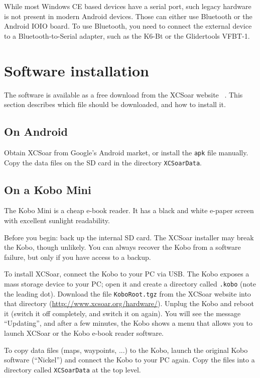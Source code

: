 While most Windows CE based devices have a serial port, such legacy
hardware is not present in modern Android devices.  Those can either
use Bluetooth or the Android IOIO board.  To use Bluetooth, you need
to connect the external device to a Bluetooth-to-Serial adapter, such
as the K6-Bt or the Glidertools VFBT-1.


\section{Software installation}

The software is available as a free download from the XCSoar website
~\xcsoarwebsite{}.  This section describes which file should be
downloaded, and how to install it.

\subsection*{On Android}

Obtain XCSoar from Google's Android market, or install the \verb|apk|
file manually.  Copy the data files on the SD card in the directory
\verb|XCSoarData|.

\subsection*{On a Kobo Mini}

The Kobo Mini is a cheap e-book reader.  It has a black and white
e-paper screen with excellent sunlight readability.

Before you begin: back up the internal SD card.  The XCSoar installer
may break the Kobo, though unlikely.  You can always recover the Kobo
from a software failure, but only if you have access to a backup.

To install XCSoar, connect the Kobo to your PC via USB.  The Kobo
exposes a mass storage device to your PC; open it and create a
directory called \texttt{.kobo} (note the leading dot).  Download the
file \texttt{KoboRoot.tgz} from the XCSoar website into that
directory (\url{http://www.xcsoar.org/hardware/}). Unplug the Kobo and reboot it (switch it off completely,
and switch it on again).  You will see the message ``Updating'', and
after a few minutes, the Kobo shows a menu that allows you to launch
XCSoar or the Kobo e-book reader software.

To copy data files (maps, waypoints, ...) to the Kobo, launch the
original Kobo software (``Nickel'') and connect the Kobo to your PC
again.  Copy the files into a directory called \texttt{XCSoarData} at
the top level.

